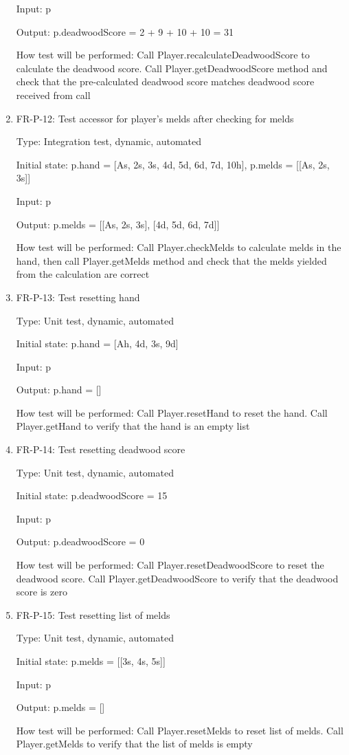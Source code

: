 \documentclass[12pt, titlepage]{article}
\begin{document}
\begin{enumerate}
    Input: p
    
    Output: p.deadwoodScore = 2 + 9 + 10 + 10 = 31
    
    How test will be performed: Call Player.recalculateDeadwoodScore to calculate the deadwood score. Call Player.getDeadwoodScore method and check that the pre-calculated deadwood score matches deadwood score received from call
    
    \item{FR-P-12: Test accessor for player's melds after checking for melds\\}
    
    Type: Integration test, dynamic, automated
    					
    Initial state: p.hand = [As, 2s, 3s, 4d, 5d, 6d, 7d, 10h], p.melds = [[As, 2s, 3s]]
    
    Input: p
    
    Output: p.melds = [[As, 2s, 3s], [4d, 5d, 6d, 7d]]
    
    How test will be performed: Call Player.checkMelds to calculate melds in the hand, then call Player.getMelds method and check that the melds yielded from the calculation are correct
    
    \item{FR-P-13: Test resetting hand\\}
    
    Type: Unit test, dynamic, automated	
    
    Initial state: p.hand = [Ah, 4d, 3s, 9d]
    
    Input: p
    
    Output: p.hand = []
    
    How test will be performed: Call Player.resetHand to reset the hand. Call Player.getHand to verify that the hand is an empty list
    
    \item{FR-P-14: Test resetting deadwood score\\}
    
    Type: Unit test, dynamic, automated	
    
    Initial state: p.deadwoodScore = 15
    
    Input: p
    
    Output: p.deadwoodScore = 0
    
    How test will be performed: Call Player.resetDeadwoodScore to reset the deadwood score. Call Player.getDeadwoodScore to verify that the deadwood score is zero
    
    \item{FR-P-15: Test resetting list of melds\\}
    
    Type: Unit test, dynamic, automated	
    
    Initial state: p.melds = [[3s, 4s, 5s]]
    
    Input: p
    
    Output: p.melds = []
    
    How test will be performed: Call Player.resetMelds to reset list of melds. Call Player.getMelds to verify that the list of melds is empty
\end{enumerate}
\end{document}
